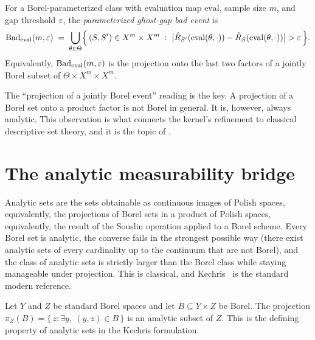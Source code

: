 \begin{defn}
\label{def:param-bad-event}
  \leanok
For a Borel-parameterized class with evaluation map $\mathrm{eval}$,
sample size $m$, and gap threshold $\varepsilon$, the \emph{parameterized
ghost-gap bad event} is
\[
  \mathrm{Bad}_{\mathrm{eval}}(m, \varepsilon)
  \;=\;
  \bigcup_{\theta \in \Theta}
  \Bigl\{\, (S, S') \in X^m \times X^m \;:\;
    \bigl| \hat{R}_{S'}(\mathrm{eval}(\theta,\cdot))
      - \hat{R}_S(\mathrm{eval}(\theta,\cdot)) \bigr| > \varepsilon
  \,\Bigr\}.
\]
Equivalently, $\mathrm{Bad}_{\mathrm{eval}}(m, \varepsilon)$ is the
projection onto the last two factors of a jointly Borel subset of
$\Theta \times X^m \times X^m$.
\end{defn}

The ``projection of a jointly Borel event'' reading is the key. A
projection of a Borel set onto a product factor is not Borel in
general. It is, however, always analytic. This observation is what
connects the kernel's refinement to classical descriptive set theory,
and it is the topic of .


\section{The analytic measurability bridge}
\label{sec:choquet-bridge}

Analytic sets are the sets obtainable as continuous images of Polish
spaces, equivalently, the projections of Borel sets in a product of
Polish spaces, equivalently, the result of the Souslin operation
applied to a Borel scheme. Every Borel set is analytic, the converse
fails in the strongest possible way (there exist analytic sets of
every cardinality up to the continuum that are not Borel), and the
class of analytic sets is strictly larger than the Borel class while
staying manageable under projection. This is classical, and
Kechris~\cite[Chapter~14]{Kechris1995} is the standard modern
reference.

\begin{lemma}
\label{lem:borel-proj-analytic}
Let $Y$ and $Z$ be standard Borel spaces and let $B \subseteq Y \times Z$
be Borel. The projection $\pi_Z(B) = \{\,z : \exists y,\ (y,z) \in B\,\}$
is an analytic subset of $Z$. This is the defining property of
analytic sets in the Kechris formulation.
\end{lemma}

